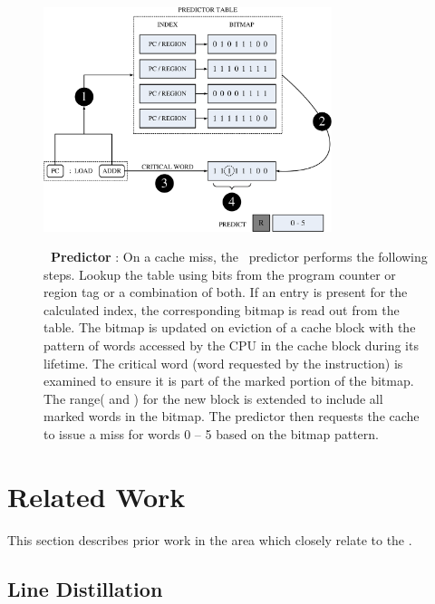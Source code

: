 \begin{figure}[h]
  \centering
  \includegraphics[width=0.75\textwidth]{files/Figures/06-Predictor.pdf}
  \\
  \caption[Amoeba-Cache Predictor]{\textbf{\AC\ Predictor} : On a cache miss, the \AC\ predictor performs the following steps.  Lookup the table using bits from the program counter or region tag or a combination of both.  If an entry is present for the calculated index, the corresponding bitmap is read out from the table. The bitmap is updated on eviction of a cache block with the pattern of words accessed by the CPU in the cache block during its lifetime.  The critical word (word requested by the instruction) is examined to ensure it is part of the marked portion of the bitmap. The range( and ) for the new block is extended to include all marked words in the bitmap.  The predictor then requests the cache to issue a miss for words 0 -- 5 based on the bitmap pattern.}
  \label{fig:predictor}
\end{figure}

\section{Related Work}

This section describes prior work in the area which closely relate to the \AC{}. 

\subsection{Line Distillation}

